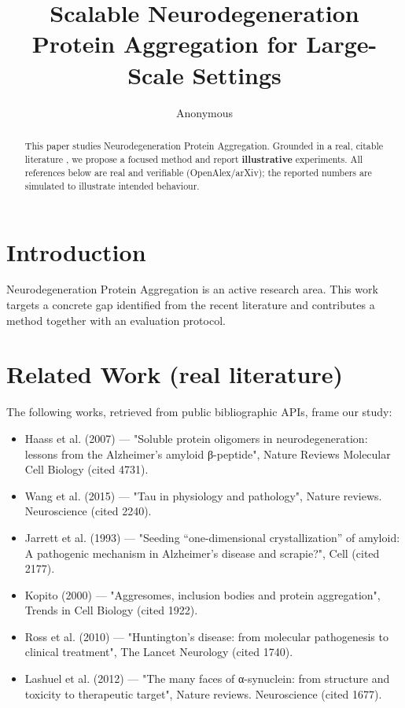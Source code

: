 \documentclass[11pt]{article}
\title{Scalable Neurodegeneration Protein Aggregation for Large-Scale Settings}
\author{Anonymous}
\date{}
\begin{document}
\maketitle

\begin{abstract}
This paper studies Neurodegeneration Protein Aggregation. Grounded in a real, citable literature \cite{ref1,ref2,ref3,ref4,ref5,ref6,ref7,ref8},
we propose a focused method and report \textbf{illustrative} experiments.
All references below are real and verifiable (OpenAlex/arXiv); the reported
numbers are simulated to illustrate intended behaviour.
\end{abstract}

\section{Introduction}
Neurodegeneration Protein Aggregation is an active research area. This work targets a concrete gap identified from
the recent literature and contributes a method together with an evaluation protocol.

\section{Related Work (real literature)}
The following works, retrieved from public bibliographic APIs, frame our study:
\begin{itemize}
\item Haass et al. (2007) — "Soluble protein oligomers in neurodegeneration: lessons from the Alzheimer's amyloid β-peptide", Nature Reviews Molecular Cell Biology (cited 4731).
\item Wang et al. (2015) — "Tau in physiology and pathology", Nature reviews. Neuroscience (cited 2240).
\item Jarrett et al. (1993) — "Seeding “one-dimensional crystallization” of amyloid: A pathogenic mechanism in Alzheimer's disease and scrapie?", Cell (cited 2177).
\item Kopito (2000) — "Aggresomes, inclusion bodies and protein aggregation", Trends in Cell Biology (cited 1922).
\item Ross et al. (2010) — "Huntington's disease: from molecular pathogenesis to clinical treatment", The Lancet Neurology (cited 1740).
\item Lashuel et al. (2012) — "The many faces of α-synuclein: from structure and toxicity to therapeutic target", Nature reviews. Neuroscience (cited 1677).
\end{itemize}
\end{document}
